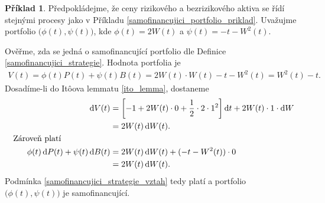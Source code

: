 \documentclass[a4paper,12pt]{report}
\theoremstyle{definition} \newtheorem{definice}[veta]{Definice}
\newtheorem{priklad}{Příklad}
\theoremstyle{remark}
\begin{document}
\begin{priklad}
Předpokládejme, že ceny rizikového a bezrizikového aktiva se řídí stejnými procesy jako v Příkladu \ref{samofinancujici_portfolio_priklad}.
Uvažujme portfolio $\big(\phi(t),\psi(t)\big)$, kde $\phi(t)=2W(t)$ a $\psi(t)=-t-W^2(t)$. 

Ověřme, zda se jedná o samofinancující portfolio dle Definice \ref{samofinancujici_strategie}.
Hodnota portfolia je 
\begin{align*}
V(t)=\phi(t)P(t)+\psi(t)B(t)=2W(t)\cdot W(t)-t-W^2(t)=W^2(t)-t. 
\end{align*}
Dosadíme-li do It\^oova lemmatu \ref{ito_lemma}, dostaneme
\begin{alignat*}{2}
\mathrm{d}V(t)&=\left[-1+2W(t)\cdot0+\frac12\cdot2\cdot1^2\right]\mathrm{d}t+2W(t)\cdot1\cdot\mathrm{d}W\\
&=2W(t)\,\mathrm{d}W(t).\\
\text{Zároveň platí}\hspace{2.1cm}\\
\phi(t)\,\mathrm{d}P(t)+\psi(t)\,\mathrm{d}B(t)&=2W(t)\,\mathrm{d}W(t)+(-t-W^2(t))\cdot0\\
&=2W(t)\,\mathrm{d}W(t).
\end{alignat*}
Podmínka \eqref{samofinancujici_strategie_vztah} tedy platí a portfolio $\big(\phi(t),\psi(t)\big)$ je samofinancující.
\end{priklad}
\end{document}
